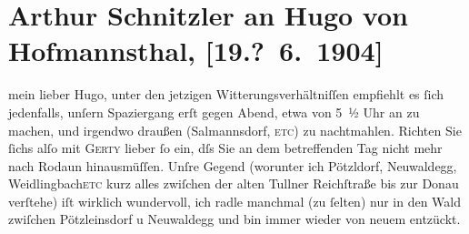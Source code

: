

         
         \renewcommand{\erwaehntePersonen}{Personen: Hugo von Hofmannsthal, Gertrude von Hofmannsthal, Karl Kraus}
         \renewcommand{\erwaehnteOrte}{Orte: Exelbergstraße, Neuwaldegg, Niederlande, Pötzleinsdorf, Rodaun, Salmannsdorf, Sizilien, Weidlingbach, Wien}
         \renewcommand{\erwaehnteWerke}{}
               \section[Arthur Schnitzler an Hugo von Hofmannsthal, {[}19.? 6. 1904{]}]{ Arthur Schnitzler an Hugo von Hofmannsthal, {[}19.? 6. 1904{]}}\nopagebreak{}\rehead{ }\begin{ledgroupsized}[t]{13cm}\normalsize\beginnumbering \toendnotes[C]{\smallbreak\pagebreak[2]} 
\toendnotes[C]{\smallbreak}\pstart{}{\pb}mein lieber Hugo, \pend\pstart
           unter den jetzigen Witterungsverhältniſſen empfiehlt es ſich jedenfalls, unſern
               Spaziergang erſt gegen Abend, etwa von 5 ½ Uhr an zu
               machen, und irgendwo draußen (Salmannsdorf, \textsc{etc}) zu nachtmahlen. Richten Sie ſichs alſo mit \textsc{Gerty} lieber ſo ein, dſs Sie an dem betreffenden Tag nicht mehr nach Rodaun hinausmüſſen. Unſre Gegend (worunter ich Pötzldorf, Neuwaldegg, {\pb}Weidlingbach\textsc{etc} kurz alles zwiſchen der alten Tullner Reichſtraße bis zur Donau verſtehe) iſt wirklich wundervoll, ich radle manchmal (zu
               ſelten) nur in den Wald zwiſchen Pötzleinsdorf u Neuwaldegg und bin immer wieder von neuem entzückt.

\end{ledgroupsized}
